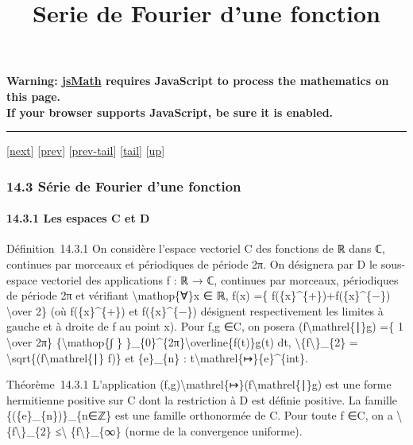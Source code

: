 \documentclass[]{article}
\title{Serie de Fourier d'une fonction}
\author{}
\date{}
\begin{document}
\maketitle

\textbf{Warning: \href{http://www.math.union.edu/locate/jsMath}{jsMath}
requires JavaScript to process the mathematics on this page.\\ If your
browser supports JavaScript, be sure it is enabled.}

\begin{center}\rule{3in}{0.4pt}\end{center}

{[}\href{coursse80.html}{next}{]} {[}\href{coursse78.html}{prev}{]}
{[}\href{coursse78.html\#tailcoursse78.html}{prev-tail}{]}
{[}\hyperref[tailcoursse79.html]{tail}{]}
{[}\href{coursch15.html\#coursse79.html}{up}{]}

\subsubsection{14.3 Série de Fourier d'une fonction}

\paragraph{14.3.1 Les espaces C et D}

Définition~14.3.1 On considère l'espace vectoriel C des fonctions de ℝ
dans ℂ, continues par morceaux et périodiques de période 2π. On
désignera par D le sous-espace vectoriel des applications f : ℝ → ℂ,
continues par morceaux, périodiques de période 2π et vérifiant
\textbackslash{}mathop\{∀\}x ∈ ℝ, f(x) =\{
f(\{x\}\^{}\{+\})+f(\{x\}\^{}\{−\}) \textbackslash{}over 2\} (où
f(\{x\}\^{}\{+\}) et f(\{x\}\^{}\{−\}) désignent respectivement les
limites à gauche et à droite de f au point x). Pour f,g ∈C, on posera
(f\textbackslash{}mathrel\{∣\}g) =\{ 1 \textbackslash{}over 2π\}
\{\textbackslash{}mathop\{∫ \}
\}\_\{0\}\^{}\{2π\}\textbackslash{}overline\{f(t)\}g(t) dt,
\textbackslash{}\textbar{}\{f\textbackslash{}\textbar{}\}\_\{2\} =
\textbackslash{}sqrt\{(f\textbackslash{}mathrel\{∣\} f)\} et
\{e\}\_\{n\} : t\textbackslash{}mathrel\{↦\}\{e\}\^{}\{int\}.

Théorème~14.3.1 L'application
(f,g)\textbackslash{}mathrel\{↦\}(f\textbackslash{}mathrel\{∣\}g) est
une forme hermitienne positive sur C dont la restriction à D est définie
positive. La famille \{(\{e\}\_\{n\})\}\_\{n∈ℤ\} est une famille
orthonormée de C. Pour toute f ∈C, on a
\textbackslash{}\textbar{}\{f\textbackslash{}\textbar{}\}\_\{2\}
≤\textbackslash{}\textbar{} \{f\textbackslash{}\textbar{}\}\_\{∞\}
(norme de la convergence uniforme).
\end{document}
